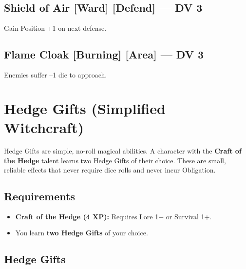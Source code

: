 \documentclass[11pt]{book}
\begin{document}
\subsection*{Shield of Air [Ward] [Defend] --- DV 3}
Gain Position +1 on next defense.

\subsection*{Flame Cloak [Burning] [Area] --- DV 3}
Enemies suffer --1 die to approach.

\section{Hedge Gifts (Simplified Witchcraft)}

Hedge Gifts are simple, no-roll magical abilities. A character with the \textbf{Craft of the Hedge} talent learns two Hedge Gifts of their choice. These are small, reliable effects that never require dice rolls and never incur Obligation.

\subsection*{Requirements}
\begin{itemize}
  \item \textbf{Craft of the Hedge (4 XP):} Requires Lore 1+ or Survival 1+.
  \item You learn \textbf{two Hedge Gifts} of your choice.
\end{itemize}

\subsection*{Hedge Gifts}
\end{document}
